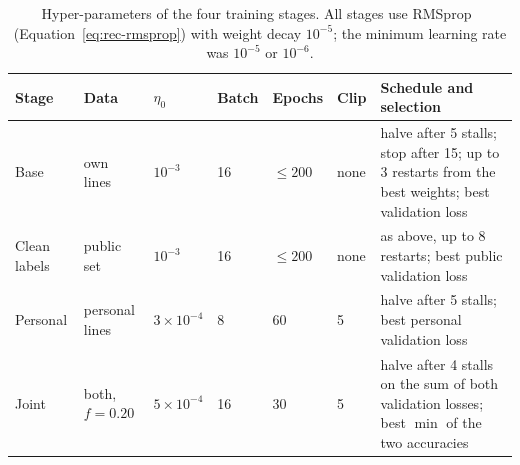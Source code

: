 \begin{table}[h]
\centering
\fontsize{9.5}{11.5}\selectfont
\begin{tabularx}{\linewidth}{|l|l|l|l|l|l|X|}
\hline
\textbf{Stage} & \textbf{Data} & \textbf{$\eta_0$} & \textbf{Batch} & \textbf{Epochs} & \textbf{Clip} & \textbf{Schedule and selection} \\
\hline
Base & own lines & $10^{-3}$ & 16 & $\le200$ & none & halve after 5 stalls; stop after 15; up to 3 restarts from the best weights; best validation loss \\
\hline
Clean labels & public set & $10^{-3}$ & 16 & $\le200$ & none & as above, up to 8 restarts; best public validation loss \\
\hline
Personal & personal lines & $3\!\times\!10^{-4}$ & 8 & 60 & 5 & halve after 5 stalls; best personal validation loss \\
\hline
Joint & both, $f=0.20$ & $5\!\times\!10^{-4}$ & 16 & 30 & 5 & halve after 4 stalls on the sum of both validation losses; best $\min$ of the two accuracies \\
\hline
\end{tabularx}
\caption{Hyper-parameters of the four training stages. All stages use RMSprop~\cite{tieleman2012} (Equation~\ref{eq:rec-rmsprop}) with weight decay $10^{-5}$; the minimum learning rate was $10^{-5}$ or $10^{-6}$.}
\label{tab:rec-stages}
\end{table}


